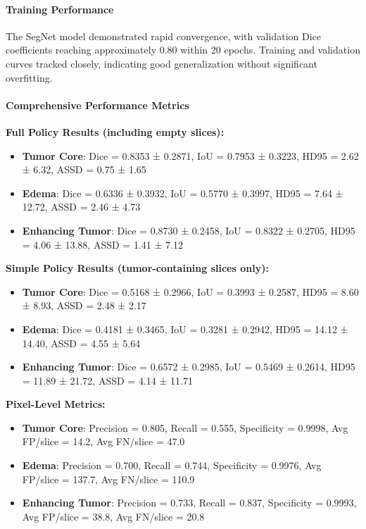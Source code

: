 \paragraph{Training Performance} The SegNet model demonstrated rapid convergence, with validation Dice coefficients reaching approximately 0.80 within 20 epochs. Training and validation curves tracked closely, indicating good generalization without significant overfitting.

\paragraph{Comprehensive Performance Metrics}

\textbf{Full Policy Results (including empty slices):}
\begin{itemize}
    \item \textbf{Tumor Core}: Dice = 0.8353 ± 0.2871, IoU = 0.7953 ± 0.3223, HD95 = 2.62 ± 6.32, ASSD = 0.75 ± 1.65
    \item \textbf{Edema}: Dice = 0.6336 ± 0.3932, IoU = 0.5770 ± 0.3997, HD95 = 7.64 ± 12.72, ASSD = 2.46 ± 4.73
    \item \textbf{Enhancing Tumor}: Dice = 0.8730 ± 0.2458, IoU = 0.8322 ± 0.2705, HD95 = 4.06 ± 13.88, ASSD = 1.41 ± 7.12
\end{itemize}

\textbf{Simple Policy Results (tumor-containing slices only):}
\begin{itemize}
    \item \textbf{Tumor Core}: Dice = 0.5168 ± 0.2966, IoU = 0.3993 ± 0.2587, HD95 = 8.60 ± 8.93, ASSD = 2.48 ± 2.17
    \item \textbf{Edema}: Dice = 0.4181 ± 0.3465, IoU = 0.3281 ± 0.2942, HD95 = 14.12 ± 14.40, ASSD = 4.55 ± 5.64
    \item \textbf{Enhancing Tumor}: Dice = 0.6572 ± 0.2985, IoU = 0.5469 ± 0.2614, HD95 = 11.89 ± 21.72, ASSD = 4.14 ± 11.71
\end{itemize}

\textbf{Pixel-Level Metrics:}
\begin{itemize}
    \item \textbf{Tumor Core}: Precision = 0.805, Recall = 0.555, Specificity = 0.9998, Avg FP/slice = 14.2, Avg FN/slice = 47.0
    \item \textbf{Edema}: Precision = 0.700, Recall = 0.744, Specificity = 0.9976, Avg FP/slice = 137.7, Avg FN/slice = 110.9
    \item \textbf{Enhancing Tumor}: Precision = 0.733, Recall = 0.837, Specificity = 0.9993, Avg FP/slice = 38.8, Avg FN/slice = 20.8
\end{itemize}

